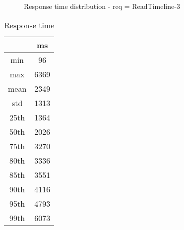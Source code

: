 \begin{minipage}{0.75\linewidth}
\begin{figure}[h]
\begin{adjustbox}{max width=1.0\linewidth, keepaspectratio}
  \end{adjustbox}
  \caption{Response time distribution - req = ReadTimeline-3}
\end{figure}
\end{minipage}\hfill\begin{minipage}{0.18\linewidth}
\begin{table}[h]
\begin{tabular}{|cc|}
\hline
\textbf{} & \textbf{ms}\\ \hline
 \Xhline{0.005\arrayrulewidth}
min & 96\\
 \Xhline{0.005\arrayrulewidth}
max & 6369\\
 \Xhline{0.005\arrayrulewidth}
mean & 2349\\
 \Xhline{0.005\arrayrulewidth}
std & 1313\\
\hline
\hline
 \Xhline{0.005\arrayrulewidth}
25th & 1364\\
 \Xhline{0.005\arrayrulewidth}
50th & 2026\\
 \Xhline{0.005\arrayrulewidth}
75th & 3270\\
 \Xhline{0.005\arrayrulewidth}
80th & 3336\\
 \Xhline{0.005\arrayrulewidth}
85th & 3551\\
 \Xhline{0.005\arrayrulewidth}
90th & 4116\\
 \Xhline{0.005\arrayrulewidth}
95th & 4793\\
 \Xhline{0.005\arrayrulewidth}
99th & 6073\\
\hline
\end{tabular}
\caption{Response time}
\end{table}
\end{minipage}\hfill